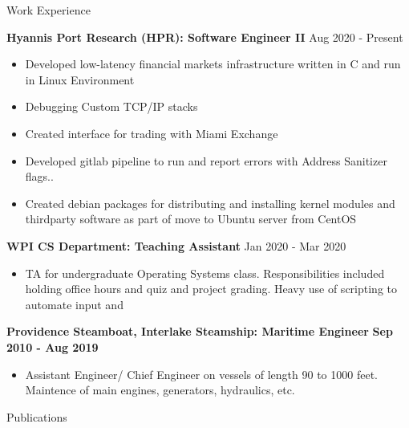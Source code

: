 \documentclass[10pt,a4paper]{article}
\begin{document}
{\begin{tcolorbox}

  {\selectfont
    \begin{center}
      \LARGE{Work Experience}
    \end{center}
  }

  \tcblower

  \large{\textbf{Hyannis Port Research (HPR): Software Engineer II}}
  \hfill
  \large{Aug 2020 - Present}
  \begin{itemize}[noitemsep]
    \item Developed low-latency financial markets infrastructure written in C and run in Linux Environment
    \item Debugging Custom TCP/IP stacks
    \item Created interface for trading with Miami Exchange
    \item Developed gitlab pipeline to run and report errors with Address Sanitizer flags..
    \item Created debian packages for distributing and installing kernel modules and thirdparty software as part of move to Ubuntu server from CentOS
  \end{itemize}

  \large{\textbf{WPI CS Department: Teaching Assistant}}
  \hfill
  \large{Jan 2020 - Mar 2020}
  \begin{itemize}[noitemsep]
    \item TA for undergraduate Operating Systems class. Responsibilities included holding office hours and quiz and project grading. Heavy use of scripting to automate input and
  \end{itemize}

  \large{\textbf{Providence Steamboat, Interlake Steamship: Maritime Engineer}}
  \hfill
  \large{\textbf{Sep 2010 - Aug 2019}}
  \begin{itemize}[noitemsep]
    \item Assistant Engineer/ Chief Engineer on vessels of length 90 to 1000 feet. Maintence of main engines, generators, hydraulics, etc.
  \end{itemize}

\end{tcolorbox}

\begin{tcolorbox}

  {\selectfont
    \begin{center}
      \LARGE{Publications}
    \end{center}
  }


\end{tcolorbox}}
\end{document}
